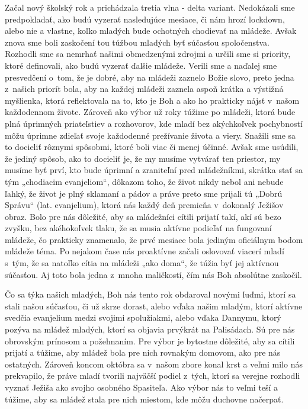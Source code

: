 Začal nový školský rok a prichádzala tretia vlna - delta variant. Nedokázali sme predpokladať, ako budú vyzerať nasledujúce mesiace, či nám hrozí lockdown, alebo nie a vlastne, koľko mladých bude ochotných chodievať na mládeže. Avšak znova sme boli zaskočení tou túžbou mladých byť súčasťou spoločenstva. Rozhodli sme sa nemrhať našimi obmedzenými zdrojmi a určili sme si priority, ktoré definovali, ako budú vyzerať ďalšie mládeže. Verili sme a naďalej sme presvedčení o~tom, že je dobré, aby na mládeži zaznelo Božie slovo, preto jedna z~našich priorít bola, aby na každej mládeži zaznela aspoň krátka a výstižná myšlienka, ktorá reflektovala na to, kto je Boh a ako ho prakticky nájsť v~našom každodennom živote. Zároveň ako výbor už roky túžime po mládeži, ktorá bude plná úprimných priateľstiev a rozhovorov, kde mladí bez akýchkoľvek pochybností môžu úprimne zdieľať svoje každodenné prežívanie života a viery. Snažili sme sa to docieliť rôznymi spôsobmi, ktoré boli viac či menej účinné. Avšak sme usúdili, že jediný spôsob, ako to docieliť je, že my musíme vytvárať ten priestor, my musíme byť prví, kto bude úprimní a zraniteľní pred mládežníkmi, skrátka stať sa tým „chodiacim evanjeliom“, dôkazom toho, že život nikdy nebol ani nebude ľahký, že život je plný sklamaní a pádov a práve preto sme prijali tú „Dobrú Správu“ (lat. evanjelium), ktorá nás každý deň premieňa v~dokonalý Ježišov obraz. 
Bolo pre nás dôležité, aby sa mládežníci cítili prijatí takí, akí sú bezo zvyšku, bez akéhokoľvek tlaku, že sa musia aktívne podieľať na fungovaní mládeže, čo prakticky znamenalo, že prvé mesiace bola jediným oficiálnym bodom mládeže téma. Po nejakom čase nás proaktívne začali oslovovať viacerí mladí s~tým, že sa natoľko cítia na mládeži „ako doma“, že túžia byť jej aktívnou súčasťou. Aj toto bola jedna z~mnoha maličkostí, čím nás Boh absolútne zaskočil. 

Čo sa týka našich mladých, Boh nás tento rok obdaroval novými ľuďmi, ktorí sa stali našou súčasťou, či už skrze dorast, alebo vďaka našim mladým, ktorí aktívne svedčia evanjelium medzi svojimi spolužiakmi, alebo vďaka Dannymu, ktorý pozýva na mládež mladých, ktorí sa objavia prvýkrát na Palisádach. Sú pre nás obrovským prínosom a požehnaním. Pre výbor je bytostne dôležité, aby sa cítili prijatí a túžime, aby mládež bola pre nich rovnakým domovom, ako pre nás ostatných. 
Zároveň koncom októbra sa v~našom zbore konal krst a veľmi milo nás prekvapilo, že práve mladí tvorili najväčší podiel z~tých, ktorí sa verejne rozhodli vyznať Ježiša ako svojho osobného Spasiteľa. Ako výbor nás to veľmi teší a túžime, aby sa mládež stala pre nich miestom, kde môžu duchovne načerpať.

